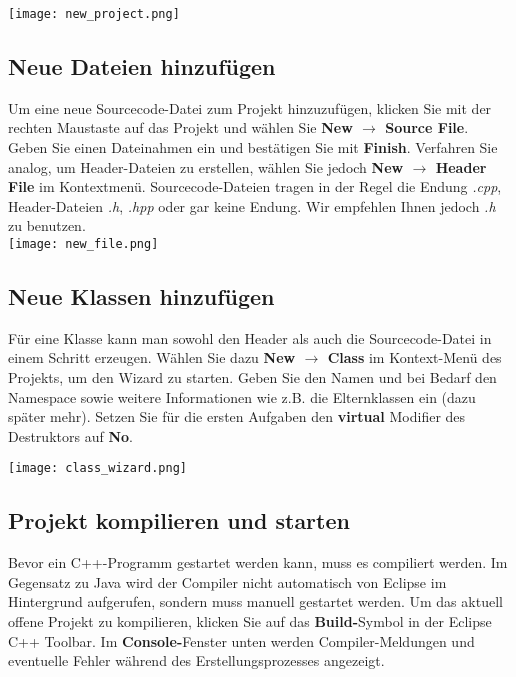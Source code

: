\documentclass[
  accentcolor=tud1c,	%
  colorbacktitle,		%
  inverttitle,			%
  german,				%
  twoside
]{tudexercise}
\begin{document}
\texttt{[image: new\_project.png]}

\subsection{Neue Dateien hinzufügen}

Um eine neue Sourcecode-Datei zum Projekt hinzuzufügen, klicken Sie mit der rechten Maustaste auf das Projekt und wählen Sie \textbf{New $\rightarrow$ Source File}. Geben Sie einen Dateinahmen ein und bestätigen Sie mit 
\textbf{Finish}. Verfahren Sie analog, um Header-Dateien zu erstellen, wählen Sie jedoch \textbf{New $\rightarrow$ Header File} im Kontextmenü. Sourcecode-Dateien tragen in der Regel die Endung \emph{.cpp}, Header-Dateien \emph{.h}, \emph{.hpp} oder gar keine Endung. Wir empfehlen Ihnen jedoch \emph{.h} zu benutzen. \\

\texttt{[image: new\_file.png]}

\subsection{Neue Klassen hinzufügen}

Für eine Klasse kann man sowohl den Header als auch die Sourcecode-Datei in einem Schritt erzeugen. Wählen Sie dazu \textbf{New $\rightarrow$ Class} im Kontext-Menü des Projekts, um den Wizard zu starten. Geben Sie den Namen und bei Bedarf den Namespace sowie weitere Informationen wie z.B. die Elternklassen ein (dazu später mehr). Setzen Sie für die ersten Aufgaben den \textbf{virtual} Modifier des Destruktors auf \textbf{No}.

\texttt{[image: class\_wizard.png]}

\subsection{Projekt kompilieren und starten}

Bevor ein C++-Programm gestartet werden kann, muss es compiliert werden. Im Gegensatz zu Java wird der Compiler nicht automatisch von Eclipse im Hintergrund aufgerufen, sondern muss manuell gestartet werden. Um das aktuell offene Projekt zu kompilieren, klicken Sie auf das \textbf{Build-}Symbol in der Eclipse C++ Toolbar. Im \textbf{Console-}Fenster unten werden Compiler-Meldungen und eventuelle Fehler während des Erstellungsprozesses angezeigt. \\
\end{document}
